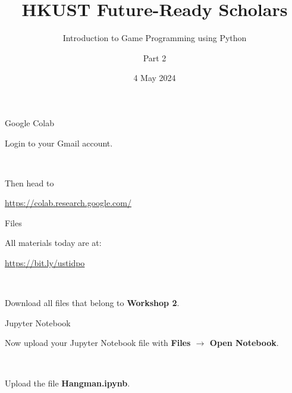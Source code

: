 \documentclass[dvipsnames, svgnames, x11names, handout]{beamer}
\title[HKUST Future-Ready Scholars]{HKUST Future-Ready Scholars}
\subtitle{Introduction to Game Programming using Python}
\author[Game Programming using Python]{Part 2}
\date[May 2024]{4 May 2024}
\begin{document}

\frame{\titlepage}

\begin{frame}[fragile]{Google Colab}
    \begin{center}
        Login to your Gmail account.

        \

        Then head to

        \href{https://colab.research.google.com/}{https://colab.research.google.com/}
    \end{center}
\end{frame}

\begin{frame}[fragile]{Files}
    \begin{center}
        All materials today are at:

        \href{https://bit.ly/ustidpo}{https://bit.ly/ustidpo}

        \


        Download all files that belong to \textbf{Workshop 2}.
    \end{center}
\end{frame}

\begin{frame}[fragile]{Jupyter Notebook}
    \begin{center}
        Now upload your Jupyter Notebook file with \textbf{Files $\rightarrow$ Open Notebook}.
    
        \


        Upload the file \textbf{Hangman.ipynb}.
    
    \end{center}
\end{frame}
\end{document}
